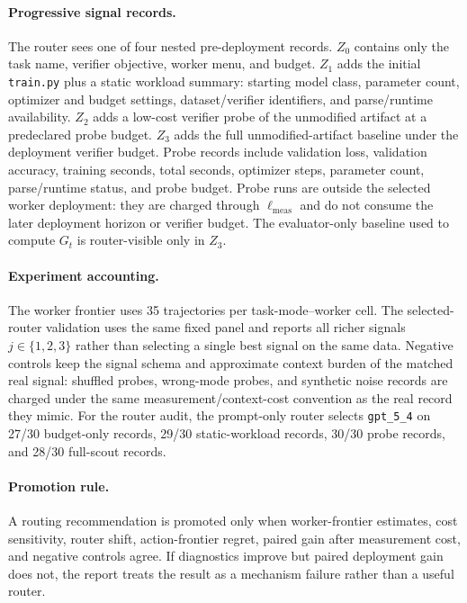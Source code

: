 \documentclass{article}
\begin{document}
\paragraph{Progressive signal records.}
The router sees one of four nested pre-deployment records.
\(Z_0\) contains only the task name, verifier objective, worker menu, and budget.
\(Z_1\) adds the initial \texttt{train.py} plus a static workload summary: starting model class, parameter count, optimizer and budget settings, dataset/verifier identifiers, and parse/runtime availability.
\(Z_2\) adds a low-cost verifier probe of the unmodified artifact at a predeclared probe budget.
\(Z_3\) adds the full unmodified-artifact baseline under the deployment verifier budget.
Probe records include validation loss, validation accuracy, training seconds, total seconds, optimizer steps, parameter count, parse/runtime status, and probe budget.
Probe runs are outside the selected worker deployment: they are charged through \(\ell_{\mathrm{meas}}\) and do not consume the later deployment horizon or verifier budget.
The evaluator-only baseline used to compute \(G_t\) is router-visible only in \(Z_3\).

\paragraph{Experiment accounting.}
The worker frontier uses 35 trajectories per task-mode--worker cell.
The selected-router validation uses the same fixed panel and reports all richer signals \(j\in\{1,2,3\}\) rather than selecting a single best signal on the same data.
Negative controls keep the signal schema and approximate context burden of the matched real signal: shuffled probes, wrong-mode probes, and synthetic noise records are charged under the same measurement/context-cost convention as the real record they mimic.
For the router audit, the prompt-only router selects \texttt{gpt\_5\_4} on 27/30 budget-only records, 29/30 static-workload records, 30/30 probe records, and 28/30 full-scout records.

\paragraph{Promotion rule.}
A routing recommendation is promoted only when worker-frontier estimates, cost sensitivity, router shift, action-frontier regret, paired gain after measurement cost, and negative controls agree.
If diagnostics improve but paired deployment gain does not, the report treats the result as a mechanism failure rather than a useful router.
\end{document}
